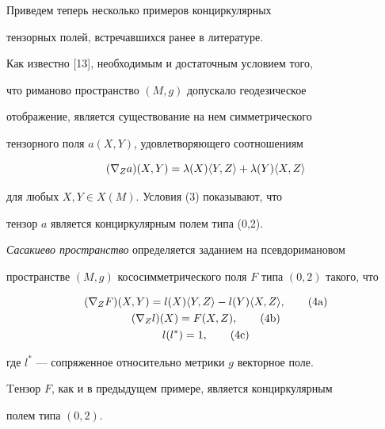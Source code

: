 Приведем теперь несколько примеров конциркулярных 


тензорных полей, встречавшихся ранее в литературе. 


 


\begin{exam}


Как известно [13], необходимым и достаточным условием того, 


что риманово пространство $(M, g)$ допускало геодезическое 


отображение, является существование на нем симметрического 


тензорного поля $a(X,Y)$, удовлетворяющего соотношениям


\begin{equation}


(\nabla_{Z} a)(X,Y) = \lambda (X) \la Y,Z \ra + \lambda (Y)\la X,Z\ra


\end{equation}


для любых $X,Y \in X(M)$. Условия (3) показывают, что 


тензор $a$ является конциркулярным полем типа (0,2).


\end{exam}





\begin{exam}


{\it Сасакиево пространство} определяется заданием на псевдоримановом 


пространстве $(M,g)$ кососимметрического поля $F$ типа $(0, 2)$ такого, что 


\begin{gather}


(\nabla_{Z}F)(X,Y) = l (X) \la Y,Z \ra - l (Y) \la X,Z \ra,\tag{4a}\\


(\nabla_{Z}l)(X) = F(X,Z), \tag{4b}\\


l(l^*) = 1,\tag{4c}


\end{gather}


где $l^*$ --- сопряженное относительно метрики $g$ векторное поле. 


Tензор $F$, как и в предыдущем примере, является конциркулярным 


полем типа $(0, 2)$.


\end{exam}


